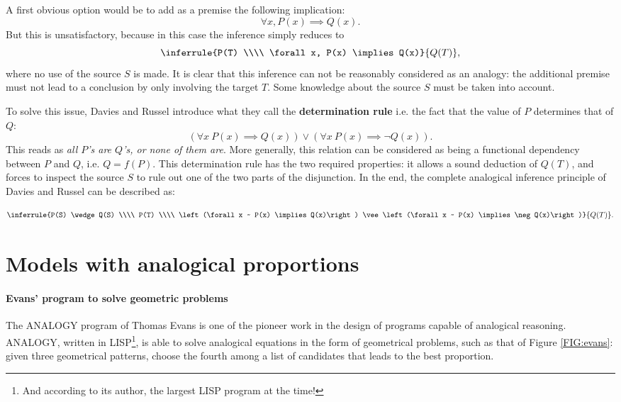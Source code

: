 A first obvious option would be to add as a premise the following implication:
$$\forall x, P(x) \implies Q(x).$$
But this is unsatisfactory, because in this case the inference simply reduces
to
$$\inferrule{P(T) \\\\ \forall x, P(x) \implies Q(x)}{Q(T)},$$ where no use of the
source $S$ is made. It is clear that this inference can not be reasonably
considered as an analogy: the additional premise must not lead to a conclusion
by only involving the target $T$. Some knowledge about the source $S$ must be
taken into account.

To solve this issue, Davies and Russel introduce what they call the
\textbf{determination rule} i.e. the fact that the value of $P$ determines that
of $Q$:
$$\left(\forall x ~ P(x) \implies Q(x)\right) \vee \left(\forall x ~ P(x) \implies
\neg Q(x)\right).$$
This reads as \textit{all $P$'s are $Q$'s, or none of them are}. More
generally, this relation can be considered as being a functional dependency
between $P$ and $Q$, i.e. $Q = f(P)$. This determination rule has the two
required properties: it allows a sound deduction of $Q(T)$, and forces to
inspect the source $S$ to rule out one of the two parts of the
disjunction. In the end, the complete analogical inference principle of Davies
and Russel can be described as:

$$\inferrule{P(S) \wedge Q(S) \\\\ P(T) \\\\  \left(\forall x ~ P(x) \implies
Q(x)\right) \vee \left(\forall x ~ P(x) \implies \neg Q(x)\right)}{Q(T)}.$$



\section{Models with analogical proportions}
\label{SEC:models_with_analogical_proportions}

\paragraph{Evans' program to solve geometric problems\\}

The ANALOGY program of Thomas Evans \cite{Eva64} is one of the pioneer work in
the design of programs capable of analogical reasoning. ANALOGY, written in
LISP\footnote{And according to its author, the largest LISP program at the
time!}, is able to solve analogical equations in the form of geometrical
problems, such as that of Figure \ref{FIG:evans}: given three geometrical
patterns, choose the fourth among a list of candidates that leads to the best
proportion.


